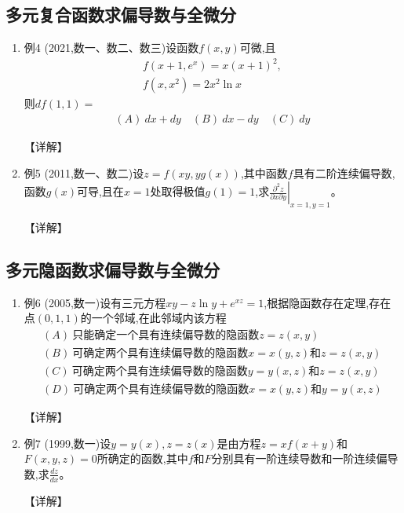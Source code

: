 \documentclass[12pt, a4paper, oneside, UTF8]{ctexbook}
\begin{document}
\subsection{多元复合函数求偏导数与全微分}

\begin{enumerate}[label=\arabic*.,start=4]
    \item 例4 (2021,数一、数二、数三)设函数$f(x,y)$可微,且
    \begin{align*}
        f(x+1,e^x)=x(x+1)^2, \\
        f(x,x^2)=2x^2\ln x
    \end{align*}
    则$df(1,1)=$
    \begin{align*}
        (A)\ dx+dy \quad (B)\ dx-dy \quad (C)\ dy
    \end{align*}
    
    \begin{solution}
    【详解】
    \end{solution}
    
    \item 例5 (2011,数一、数二)设$z=f(xy,yg(x))$,其中函数$f$具有二阶连续偏导数,函数$g(x)$可导,且在$x=1$处取得极值$g(1)=1$,求$\left.\frac{\partial^2 z}{\partial x\partial y}\right|_{x=1,y=1}$。
    
    \begin{solution}
    【详解】
    \end{solution}
\end{enumerate}

\subsection{多元隐函数求偏导数与全微分}

\begin{enumerate}[label=\arabic*.,start=6]
    \item 例6 (2005,数一)设有三元方程$xy-z\ln y+e^{xz}=1$,根据隐函数存在定理,存在点$(0,1,1)$的一个邻域,在此邻域内该方程
    \begin{align*}
        (A)\ \text{只能确定一个具有连续偏导数的隐函数}z=z(x,y) \\
        (B)\ \text{可确定两个具有连续偏导数的隐函数}x=x(y,z)\text{和}z=z(x,y) \\
        (C)\ \text{可确定两个具有连续偏导数的隐函数}y=y(x,z)\text{和}z=z(x,y) \\
        (D)\ \text{可确定两个具有连续偏导数的隐函数}x=x(y,z)\text{和}y=y(x,z)
    \end{align*}
    
    \begin{solution}
    【详解】
    \end{solution}
    
    \item 例7 (1999,数一)设$y=y(x),z=z(x)$是由方程$z=xf(x+y)$和$F(x,y,z)=0$所确定的函数,其中$f$和$F$分别具有一阶连续导数和一阶连续偏导数,求$\frac{dz}{dx}$。
    
    \begin{solution}
    【详解】
    \end{solution}
\end{enumerate}
\end{document}
